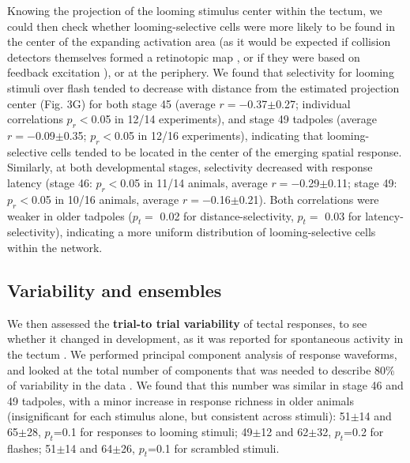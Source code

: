 \documentclass{article}
\begin{document}
Knowing the projection of the looming stimulus center within the tectum, we could then check whether looming-selective cells were more likely to be found in the center of the expanding activation area (as it would be expected if collision detectors themselves formed a retinotopic map \citep{frost2004review}, or if they were based on feedback excitation \citep{jang2016}), or at the periphery. We found that selectivity for looming stimuli over flash tended to decrease with distance from the estimated projection center (Fig. 3G) for both stage 45 (average $r=-$0.37$\pm$0.27; individual correlations $p_r<$0.05 in 12/14 experiments), and stage 49 tadpoles (average $r=-$0.09$\pm$0.35; $p_r<$0.05 in 12/16 experiments), indicating that looming-selective cells tended to be located in the center of the emerging spatial response. Similarly, at both developmental stages, selectivity decreased with response latency (stage 46: $p_r<$0.05 in 11/14 animals, average $r=-$0.29$\pm$0.11; stage 49: $p_r<$0.05 in 10/16 animals, average $r=-$0.16$\pm$0.21). Both correlations were weaker in older tadpoles ($p_t=$ 0.02 for distance-selectivity, $p_t=$ 0.03 for latency-selectivity), indicating a more uniform distribution of looming-selective cells within the network.

\subsection*{Variability and ensembles}

We then assessed the \textbf{trial-to trial variability} of tectal responses, to see whether it changed in development, as it was reported for spontaneous activity in the tectum \citep{xu2011}. We performed principal component analysis of response waveforms, and looked at the total number of components that was needed to describe 80\% of variability in the data \citep{avitan2017spontaneous}. We found that this number was similar in stage 46 and 49 tadpoles, with a minor increase in response richness in older animals (insignificant for each stimulus alone, but consistent across stimuli): 51$\pm$14 and 65$\pm$28, $p_t$=0.1 for responses to looming stimuli; 49$\pm$12 and 62$\pm$32, $p_t$=0.2 for flashes; 51$\pm$14 and 64$\pm$26, $p_t$=0.1 for scrambled stimuli.
\end{document}

